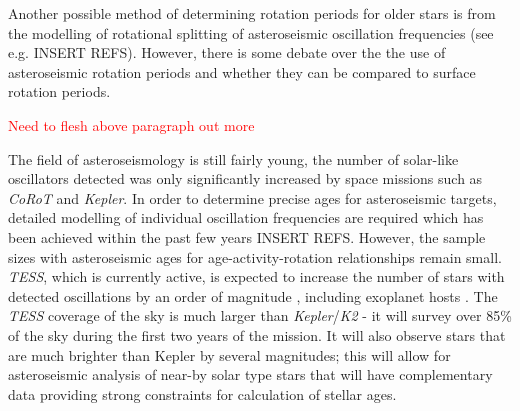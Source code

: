 Another possible method of determining rotation periods for older stars is from the modelling of rotational splitting of asteroseismic oscillation frequencies (see e.g. INSERT REFS). However, there is some debate over the the use of asteroseismic rotation periods and whether they can be compared to surface rotation periods. 

\textcolor{red}{Need to flesh above paragraph out more}

The field of asteroseismology is still fairly young, the number of solar-like oscillators detected was only significantly increased by space missions such as \textit{CoRoT} and \textit{Kepler}. In order to determine precise ages for asteroseismic targets, detailed modelling of individual oscillation frequencies are required which has been achieved within the past few years \citep{Silva_Aguirre_etal_2017} INSERT REFS. However, the sample sizes with asteroseismic ages for age-activity-rotation relationships remain small. \textit{TESS}, which is currently active, is expected to increase the number of stars with detected oscillations by an order of magnitude \citep{Schofield_etal_2019}, including exoplanet hosts \citep{Campante_etal_2016}. The \textit{TESS} coverage of the sky is much larger than \textit{Kepler}/\textit{K2} - it will survey over 85\% of the sky during the first two years of the mission. It will also observe stars that are much brighter than Kepler by several magnitudes; this will allow for asteroseismic analysis of near-by solar type stars that will have complementary data providing strong constraints for calculation of stellar ages.








